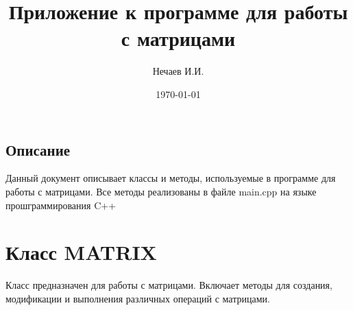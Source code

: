 \documentclass{article}
\title{Приложение к программе для работы с матрицами}
\author{Нечаев И.И.}
\date{\today}
\begin{document}
\maketitle

\begin{tcolorbox}[colframe=blue!75!black,colback=blue!10!white]
\section*{Описание}
Данный документ описывает классы и методы, используемые в программе для работы с матрицами.
Все методы реализованы в файле main.cpp на языке прошграммирования C++
\end{tcolorbox}

\section*{Класс MATRIX}
Класс предназначен для работы с матрицами. Включает методы для создания, модификации и выполнения различных операций с матрицами.
\end{document}
